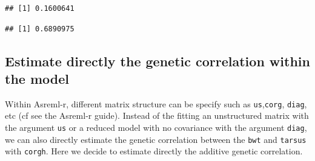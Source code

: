 \documentclass[
  12pt,
]{book}
\newenvironment{Shaded}{\begin{snugshade}}{\end{snugshade}}
\newcommand{\DecValTok}[1]{\textcolor[rgb]{0.00,0.00,0.81}{#1}}
\newcommand{\KeywordTok}[1]{\textcolor[rgb]{0.13,0.29,0.53}{\textbf{#1}}}
\newcommand{\NormalTok}[1]{#1}
\newcommand{\OperatorTok}[1]{\textcolor[rgb]{0.81,0.36,0.00}{\textbf{#1}}}
\newcommand{\StringTok}[1]{\textcolor[rgb]{0.31,0.60,0.02}{#1}}
\begin{document}
\begin{Shaded}
\end{Shaded}

\begin{verbatim}
## [1] 0.1600641
\end{verbatim}

\begin{Shaded}
\end{Shaded}

\begin{verbatim}
## [1] 0.6890975
\end{verbatim}

\hypertarget{estimate-directly-the-genetic-correlation-within-the-model}{%
\subsection{Estimate directly the genetic correlation within the model}\label{estimate-directly-the-genetic-correlation-within-the-model}}

Within Asreml-r, different matrix structure can be specify such as \texttt{us},\texttt{corg}, \texttt{diag}, etc (cf see the Asreml-r guide). Instead of the fitting an unstructured matrix with the argument \texttt{us} or a reduced model with no covariance with the argument \texttt{diag}, we can also directly estimate the genetic correlation between the \texttt{bwt} and \texttt{tarsus} with \texttt{corgh}.
Here we decide to estimate directly the additive genetic correlation.
\end{document}

